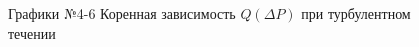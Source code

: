 \documentclass[a4paper]{article}
\begin{document}
\begin{enumerate}
\begin{figure}[h!]
\caption[]{\label{} Графики №4-6 Коренная зависимость $Q(\Delta P)$ при турбулентном течении}
\end{figure}
\clearpage
\begin{figure}[h!]

\end{figure}
\end{enumerate}
\end{document}

